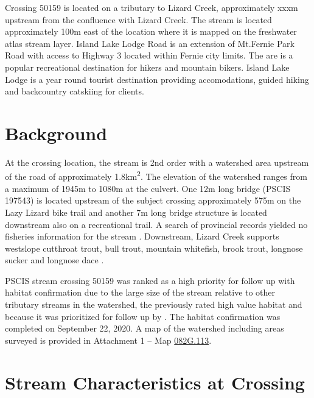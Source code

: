 \documentclass[
]{book}
\begin{document}
Crossing 50159 is located on a tributary to Lizard Creek, approximately xxxm upstream from the confluence with Lizard Creek. The stream is located approximately 100m east of the location where it is mapped on the freshwater atlas stream layer. Island Lake Lodge Road is an extension of Mt.Fernie Park Road with access to Highway 3 located within Fernie city limits. The are is a popular recreational destination for hikers and mountain bikers. Island Lake Lodge is a year round tourist destination providing accomodations, guided hiking and backcountry catskiing for clients.

\hypertarget{background-2}{%
\section*{Background}\label{background-2}}

At the crossing location, the stream is 2nd order with a watershed area upstream of the road of approximately 1.8km\textsuperscript{2}. The elevation of the watershed ranges from a maximum of 1945m to 1080m at the culvert. One 12m long bridge (PSCIS 197543) is located upstream of the subject crossing approximately 575m on the Lazy Lizard bike trail and another 7m long bridge structure is located downstream also on a recreational trail. A search of provincial records yielded no fisheries information for the stream \citep{moeStreamInventorySample}. Downstream, Lizard Creek supports westslope cutthroat trout, bull trout, mountain whitefish, brook trout, longnose sucker and longnose dace \citep{data_fish_obs}.

PSCIS stream crossing 50159 was ranked as a high priority for follow up with habitat confirmation due to the large size of the stream relative to other tributary streams in the watershed, the previously rated high value habitat and because it was prioritized for follow up by \citet{vastFishPassage2013}. The habitat confirmation was completed on September 22, 2020. A map of the watershed including areas surveyed is provided in Attachment 1 -- Map \href{https://hillcrestgeo.ca/outgoing/fishpassage/projects/elk/FishPassage_082G.113.pdf}{082G.113}.

\hypertarget{stream-characteristics-at-crossing-1}{%
\section*{Stream Characteristics at Crossing}\label{stream-characteristics-at-crossing-1}}
\end{document}
